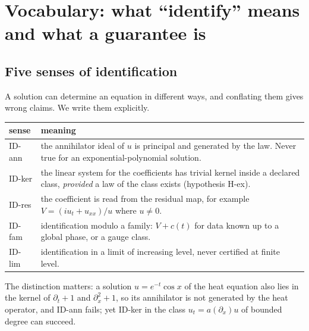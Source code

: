 \documentclass[11pt]{article}
\theoremstyle{plain}
\theoremstyle{definition}
\theoremstyle{remark}
\begin{document}
\section{Vocabulary: what ``identify'' means and what a guarantee is}\label{sec:contract}
\subsection{Five senses of identification}
A solution can determine an equation in different ways, and conflating them gives wrong claims. We write them explicitly.
\begin{center}\small
\begin{tabular}{@{}lp{9cm}@{}}
\toprule
sense & meaning\\
\midrule
ID-ann & the annihilator ideal of $u$ is principal and generated by the law. Never true for an exponential-polynomial solution.\\
ID-ker & the linear system for the coefficients has trivial kernel inside a declared class, \emph{provided} a law of the class exists (hypothesis H-ex).\\
ID-res & the coefficient is read from the residual map, for example $V=(iu_t+u_{xx})/u$ where $u\neq0$.\\
ID-fam & identification modulo a family: $V+c(t)$ for data known up to a global phase, or a gauge class.\\
ID-lim & identification in a limit of increasing level, never certified at finite level.\\
\bottomrule
\end{tabular}
\end{center}
The distinction matters: a solution $u=e^{-t}\cos x$ of the heat equation also lies in the kernel of $\partial_t+1$ and $\partial_x^2+1$, so its annihilator is
not generated by the heat operator, and ID-ann fails; yet ID-ker in the class $u_t=a(\partial_x)u$ of bounded degree can succeed.
\end{document}
